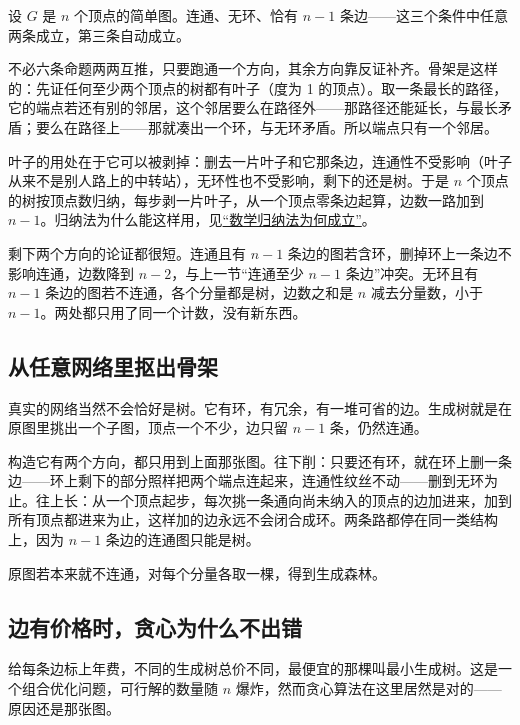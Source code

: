 \begin{theorem}[树的三条件]
设 \(G\) 是 \(n\) 个顶点的简单图。连通、无环、恰有 \(n-1\) 条边——这三个条件中任意两条成立，第三条自动成立。
\end{theorem}

不必六条命题两两互推，只要跑通一个方向，其余方向靠反证补齐。骨架是这样的：先证任何至少两个顶点的树都有叶子（度为 1 的顶点）。取一条最长的路径，它的端点若还有别的邻居，这个邻居要么在路径外——那路径还能延长，与最长矛盾；要么在路径上——那就凑出一个环，与无环矛盾。所以端点只有一个邻居。

叶子的用处在于它可以被剥掉：删去一片叶子和它那条边，连通性不受影响（叶子从来不是别人路上的中转站），无环性也不受影响，剩下的还是树。于是 \(n\) 个顶点的树按顶点数归纳，每步剥一片叶子，从一个顶点零条边起算，边数一路加到 \(n-1\)。归纳法为什么能这样用，见\hyperref[sec:01-Mathematical-Language/04-Induction-and-Recursion/01]{``数学归纳法为何成立''}。

剩下两个方向的论证都很短。连通且有 \(n-1\) 条边的图若含环，删掉环上一条边不影响连通，边数降到 \(n-2\)，与上一节``连通至少 \(n-1\) 条边''冲突。无环且有 \(n-1\) 条边的图若不连通，各个分量都是树，边数之和是 \(n\) 减去分量数，小于 \(n-1\)。两处都只用了同一个计数，没有新东西。

\subsection{从任意网络里抠出骨架}

真实的网络当然不会恰好是树。它有环，有冗余，有一堆可省的边。生成树就是在原图里挑出一个子图，顶点一个不少，边只留 \(n-1\) 条，仍然连通。

构造它有两个方向，都只用到上面那张图。往下削：只要还有环，就在环上删一条边——环上剩下的部分照样把两个端点连起来，连通性纹丝不动——删到无环为止。往上长：从一个顶点起步，每次挑一条通向尚未纳入的顶点的边加进来，加到所有顶点都进来为止，这样加的边永远不会闭合成环。两条路都停在同一类结构上，因为 \(n-1\) 条边的连通图只能是树。

原图若本来就不连通，对每个分量各取一棵，得到生成森林。

\subsection{边有价格时，贪心为什么不出错}

给每条边标上年费，不同的生成树总价不同，最便宜的那棵叫最小生成树。这是一个组合优化问题，可行解的数量随 \(n\) 爆炸，然而贪心算法在这里居然是对的——原因还是那张图。


